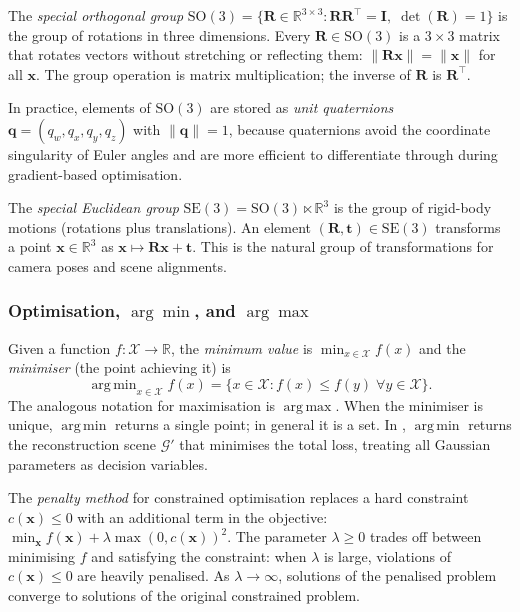 \documentclass[11pt,a4paper]{article}
\theoremstyle{plain}
\theoremstyle{definition}
\theoremstyle{remark}
\DeclareMathOperator*{\argmin}{arg\,min}
\DeclareMathOperator*{\argmax}{arg\,max}
\newcommand{\SO}{\mathrm{SO}}
\newcommand{\SE}{\mathrm{SE}}
\newcommand{\GS}{\mathcal{G}}
\begin{document}
The \emph{special orthogonal group}
$\SO(3) = \{\mathbf{R} \in \mathbb{R}^{3\times3} : \mathbf{R}\mathbf{R}^\top = \mathbf{I},\;
\det(\mathbf{R}) = 1\}$
is the group of rotations in three dimensions. Every $\mathbf{R} \in
\SO(3)$ is a $3 \times 3$ matrix that rotates vectors without
stretching or reflecting them: $\|\mathbf{R}\mathbf{x}\| = \|\mathbf{x}\|$
for all $\mathbf{x}$. The group operation is matrix multiplication;
the inverse of $\mathbf{R}$ is $\mathbf{R}^\top$.

In practice, elements of $\SO(3)$ are stored as \emph{unit
quaternions} $\mathbf{q} = (q_w, q_x, q_y, q_z)$ with
$\|\mathbf{q}\| = 1$, because quaternions avoid the coordinate
singularity of Euler angles and are more efficient to differentiate
through during gradient-based optimisation.

The \emph{special Euclidean group}
$\SE(3) = \SO(3) \ltimes \mathbb{R}^3$
is the group of rigid-body motions (rotations plus translations).
An element $(\mathbf{R}, \mathbf{t}) \in \SE(3)$ transforms a point
$\mathbf{x} \in \mathbb{R}^3$ as $\mathbf{x} \mapsto \mathbf{R}\mathbf{x} + \mathbf{t}$.
This is the natural group of transformations for camera poses and
scene alignments.

\subsubsection{Optimisation, $\arg\min$, and $\arg\max$}

Given a function $f : \mathcal{X} \to \mathbb{R}$, the \emph{minimum
value} is $\min_{x \in \mathcal{X}} f(x)$ and the \emph{minimiser}
(the point achieving it) is
\[
  \argmin_{x \in \mathcal{X}} f(x)
  = \{x \in \mathcal{X} : f(x) \leq f(y)\;\forall y \in \mathcal{X}\}.
\]
The analogous notation for maximisation is $\argmax$. When the
minimiser is unique, $\argmin$ returns a single point; in general it
is a set. In , $\argmin$ returns the
reconstruction scene $\GS'$ that minimises the total loss, treating
all Gaussian parameters as decision variables.

The \emph{penalty method} for constrained optimisation replaces a
hard constraint $c(\mathbf{x}) \leq 0$ with an additional term in
the objective: $\min_{\mathbf{x}} f(\mathbf{x}) + \lambda \max(0, c(\mathbf{x}))^2$.
The parameter $\lambda \geq 0$ trades off between minimising $f$ and
satisfying the constraint: when $\lambda$ is large, violations of
$c(\mathbf{x}) \leq 0$ are heavily penalised. As $\lambda \to \infty$,
solutions of the penalised problem converge to solutions of the
original constrained problem.
\end{document}

